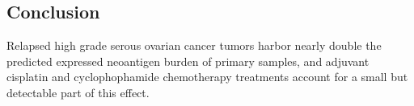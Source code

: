
\subsection*{Conclusion}
Relapsed high grade serous ovarian cancer tumors harbor nearly double the predicted expressed neoantigen burden of primary samples, and adjuvant cisplatin and cyclophophamide chemotherapy treatments account for a small but detectable part of this effect.







